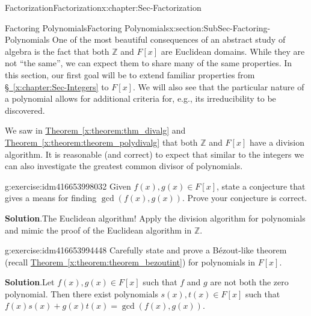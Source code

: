 \documentclass[oneside,10pt,]{book}
\numberwithin{equation}{section}
\def\Z{{\mathbb Z}}
\begin{document}
%
%
\typeout{************************************************}
\typeout{************************************************}
%
\begin{chapterptx}{Factorization}{}{Factorization}{}{}{x:chapter:Sec-Factorization}
%
%
\typeout{************************************************}
\typeout{************************************************}
%
\begin{sectionptx}{Factoring Polynomials}{}{Factoring Polynomials}{}{}{x:section:SubSec-Factoring-Polynomials}
One of the most beautiful consequences of an abstract study of algebra is the fact that both \(\Z\) and \(F[x]\) are Euclidean domains. While they are not ``the same'', we can expect them to share many of the same properties. In this section, our first goal will be to extend familiar properties from \hyperref[x:chapter:Sec-Integers]{§~\ref{x:chapter:Sec-Integers}} to \(F[x]\). We will also see that the particular nature of a polynomial allows for additional criteria for, e.g., its irreducibility to be discovered.%
\par
We saw in \hyperref[x:theorem:thm_divalg]{Theorem~\ref{x:theorem:thm_divalg}} and \hyperref[x:theorem:theorem_polydivalg]{Theorem~\ref{x:theorem:theorem_polydivalg}} that both \(\Z\) and \(F[x]\) have a division algorithm. It is reasonable (and correct) to expect that similar to the integers we can also investigate the greatest common divisor of polynomials.%
\begin{inlineexercise}{}{g:exercise:idm416653998032}%
Given \(f(x),g(x)\in F[x]\), state a conjecture that gives a means for finding \(\gcd(f(x),g(x))\). Prove your conjecture is correct.%
\par\smallskip%
\noindent\textbf{Solution}.\hypertarget{g:solution:idm416653995968}{}\quad{}The Euclidean algorithm! Apply the division algorithm for polynomials and mimic the proof of the Euclidean algorithm in \(\Z\).%
\end{inlineexercise}
\begin{inlineexercise}{}{g:exercise:idm416653994448}%
Carefully state and prove a Bézout-like theorem (recall \hyperref[x:theorem:theorem_bezoutint]{Theorem~\ref{x:theorem:theorem_bezoutint}}) for polynomials in \(F[x]\).%
\par\smallskip%
\noindent\textbf{Solution}.\hypertarget{g:solution:idm416653992176}{}\quad{}Let \(f(x),
g(x)\in F[x]\) such that \(f\) and \(g\) are not both the zero polynomial. Then there exist polynomials \(s(x),
t(x)\in F[x]\) such that \(f(x) s(x) + g(x) t(x) = \gcd(f(x),g(x))\).%

\end{inlineexercise}
\end{sectionptx}
\end{chapterptx}
\end{document}
